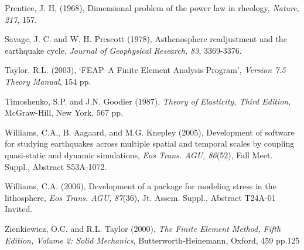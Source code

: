 \documentclass{pylithdoc}
\begin{document}
\begin{thebibliography}{widestentry}
Prentice, J. H, (1968), Dimensional
problem of the power law in rheology, \textit{Nature}, \textit{217},
157.

Savage,
J. C. and W. H. Prescott (1978), Asthenosphere readjustment and the
earthquake cycle, \textit{Journal of Geophysical} \textit{Research}\emph{,
83}, 3369-3376.

Taylor, R.L. (2003), `FEAP--A
Finite Element Analysis Program', \textit{Version 7.5 Theory Manual},
154 pp.

Timoshenko,
S.P. and J.N. Goodier (1987), \textit{Theory of Elasticity, Third
Edition}, McGraw-Hill, New York, 567 pp.

Williams, C.A.,
B. Aagaard, and M.G. Knepley (2005), Development of software for studying
earthquakes across multiple spatial and temporal scales by coupling
quasi-static and dynamic simulations, \emph{Eos Trans. AGU, 86}(52),
Fall Meet. Suppl., Abstract S53A-1072.

Williams, C.A. (2006), Development
of a package for modeling stress in the lithosphere, \emph{Eos Trans.
AGU,} \emph{87}(36), Jt. Assem. Suppl., Abstract T24A-01 Invited.

Zienkiewicz,
O.C. and R.L. Taylor (2000), \textit{The Finite Element Method, Fifth
Edition, Volume 2: Solid Mechanics}, Butterworth-Heinemann, Oxford,
459 pp.125\end{thebibliography}
\end{document}
